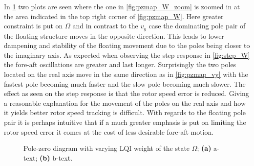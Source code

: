 In \cref{fig:pzmap_W_both} two plots are seen where the one in \cref{fig:pzmap_W_zoom} is zoomed in at the area indicated in the top right corner of \cref{fig:pzmap_W}. Here greater constraint is put on $ \Omega $ and in contrast to the $ v_y $ case the dominating pole pair of the floating structure moves in the opposite direction. This leads to lower dampening and stability of the floating movement due to the poles being closer to the imaginary axis. As expected when observing the step response in \cref{fig:step_W} the fore-aft oscillations are greater and last longer. Surprisingly the two poles located on the real axis move in the same direction as in \cref{fig:pzmap_vy} with the fastest pole becoming much faster and the slow pole becoming much slower. The effect as seen on the step response is that the rotor speed error is reduced. Giving a reasonable explanation for the movement of the poles on the real axis and how it yields better rotor speed tracking is difficult. With regards to the floating pole pair it is perhaps intuitive that if a much greater emphasis is put on limiting the rotor speed error it comes at the cost of less desirable fore-aft motion.
\begin{figure}[ht]
	\centering
	
	\hfil
	
	\caption{Pole-zero diagram with varying LQI weight of the state $ \Omega $; \textbf{(a)} a-text; \textbf{(b)} b-text.}
	\label{fig:pzmap_W_both}
\end{figure}

